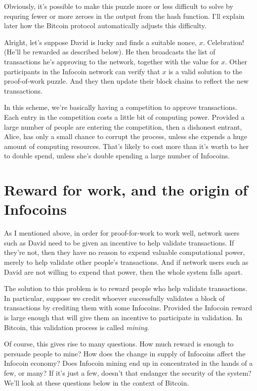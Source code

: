 \documentclass[12pt]{book}
\newcounter{problem}[chapter]
\begin{document}
Obviously, it's possible to make this puzzle more or less difficult to
solve by requring fewer or more zeroes in the output from the hash
function.  I'll explain later how the Bitcoin protocol automatically
adjusts this difficulty.

Alright, let's suppose David is lucky and finds a suitable nonce, $x$.
Celebration!  (He'll be rewarded as described below).  He then
broadcasts the list of transactions he's approving to the network,
together with the value for $x$.  Other participants in the Infocoin
network can verify that $x$ is a valid solution to the proof-of-work
puzzle.  And they then update their block chains to reflect the new
transactions.

In this scheme, we're basically having a competition to approve
transactions.  Each entry in the competition costs a little bit of
computing power.  Provided a large number of people are entering the
competition, then a dishonest entrant, Alice, has only a small chance
to corrupt the process, unless she expends a huge amount of computing
resources.  That's likely to cost more than it's worth to her to
double spend, unless she's double spending a large number of
Infocoins.

\section{Reward for work, and the origin of Infocoins}

As I mentioned above, in order for proof-for-work to work well,
network users such as David need to be given an incentive to help
validate transactions.  If they're not, then they have no reason to
expend valuable computational power, merely to help validate other
people's transactions.  And if network users such as David are not
willing to expend that power, then the whole system falls apart.

The solution to this problem is to reward people who help validate
transactions.  In particular, suppose we credit whoever successfully
validates a block of transactions by crediting them with some
Infocoins.  Provided the Infocoin reward is large enough that will
give them an incentive to participate in validation.  In Bitcoin, this
validation process is called \emph{mining}.

Of course, this gives rise to many questions.  How much reward is
enough to persuade people to mine?  How does the change in supply of
Infocoins affect the Infocoin economy?  Does Infocoin mining end up in
concentrated in the hands of a few, or many?  If it's just a few,
doesn't that endanger the security of the system?  We'll look at these
questions below in the context of Bitcoin.
\end{document}

